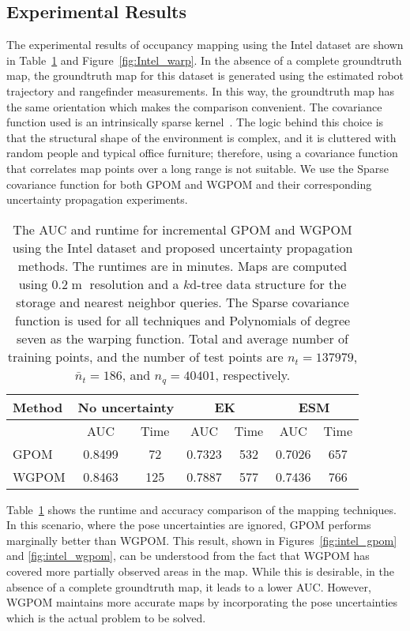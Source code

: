 \documentclass[letterpaper, 10 pt, journal, twoside]{IEEEtran}  %
\newcommand{\m}{\mathop{\mathrm{m}}}
\begin{document}
\subsection{Experimental Results}
\label{subsec:wmapexpres}
The experimental results of occupancy mapping using the Intel dataset are shown in Table~\ref{tab:intelaucroc} and Figure~\ref{fig:Intel_warp}. In the absence of a complete groundtruth map, the groundtruth map for this dataset is generated using the estimated robot trajectory and rangefinder measurements. In this way, the groundtruth map has the same orientation which makes the comparison convenient. The covariance function used is an intrinsically sparse kernel~\cite{melkumyan2009sparse}. The logic behind this choice is that the structural shape of the environment is complex, and it is cluttered with random people and typical office furniture; therefore, using a covariance function that correlates map points over a long range is not suitable. We use the Sparse covariance function for both GPOM and WGPOM and their corresponding uncertainty propagation experiments.


\begin{table}
\footnotesize
\centering
\caption{The AUC and runtime for incremental GPOM and WGPOM using the Intel dataset and proposed uncertainty propagation methods. The runtimes are in minutes. Maps are computed using $0.2\m$ resolution and a $k$d-tree data structure for the storage and nearest neighbor queries. The Sparse covariance function is used for all techniques and Polynomials of degree seven as the warping function. Total and average number of training points, and the number of test points are $n_{t} = 137979$, $\bar{n}_{t} = 186$, and $n_{q}= 40401$, respectively.}
\begin{tabular}{lcccccc}
\toprule
Method	&\multicolumn{2}{c}{No uncertainty} & \multicolumn{2}{c}{EK} & \multicolumn{2}{c}{ESM} \\ \midrule
				& AUC		& Time 	& AUC		& Time 	& AUC		& Time  \\ \midrule
GPOM			& 0.8499	& 72	& 0.7323	& 532 	& 0.7026	& 657 	\\
WGPOM			& 0.8463	& 125	& 0.7887	& 577 	& 0.7436	& 766 \\ \bottomrule
\end{tabular}
\label{tab:intelaucroc}
\end{table}

Table~\ref{tab:intelaucroc} shows the runtime and accuracy comparison of the mapping techniques. In this scenario, where the pose uncertainties are ignored, GPOM performs marginally better than WGPOM. This result, shown in Figures~\ref{fig:intel_gpom} and \ref{fig:intel_wgpom}, can be understood from the fact that WGPOM has covered more partially observed areas in the map. While this is desirable, in the absence of a complete groundtruth map, it leads to a lower AUC. However, WGPOM maintains more accurate maps by incorporating the pose uncertainties which is the actual problem to be solved.
\end{document}

